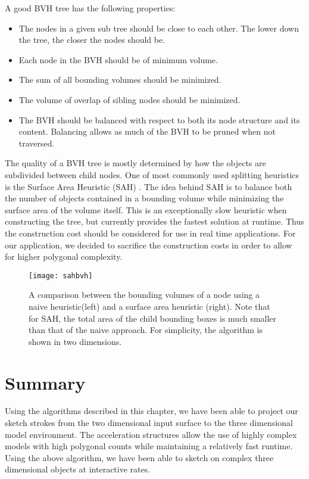  A good BVH tree has the following properties:
 \begin{itemize}
 \item The nodes in a given sub tree should be close to each other. The lower down the tree, the closer the nodes should be.
 \item Each node in the BVH should be of minimum volume.
 \item The sum of all bounding volumes should be minimized.
 \item The volume of overlap of sibling nodes should be minimized.
 \item The BVH should be balanced with respect to both its node structure and its content. Balancing allows as much of the BVH to be pruned when not traversed.
 \end{itemize}
The quality of a BVH tree is mostly determined by how the objects are subdivided between child nodes.
One of most commonly used splitting heuristics is the Surface Area Heuristic (SAH) \autocite{sah}.
The idea behind SAH is to balance both the number of objects contained in a bounding volume while minimizing the surface area of the volume itself.
This is an exceptionally slow heuristic when constructing the tree, but currently provides the fastest solution at runtime.
Thus the construction cost should be considered for use in real time applications.
For our application, we decided to sacrifice the construction costs in order to allow for higher polygonal complexity.

\begin{figure}
\texttt{[image: sahbvh]}
\caption[SAH Comparison]{A comparison between the bounding volumes of a node using a naive heuristic(left) and a surface area heuristic (right). Note that for SAH, the total area of the child bounding boxes is much smaller than that of the naive approach. For simplicity, the algorithm is shown in two dimensions.}
\end{figure}

\section{Summary}

Using the algorithms described in this chapter, we have been able to project our sketch strokes from the two dimensional input surface to the three dimensional model environment.
The acceleration structures allow the use of highly complex models with high polygonal counts while maintaining a relatively fast runtime.
Using the above algorithm, we have been able to sketch on complex three dimensional objects at interactive rates.